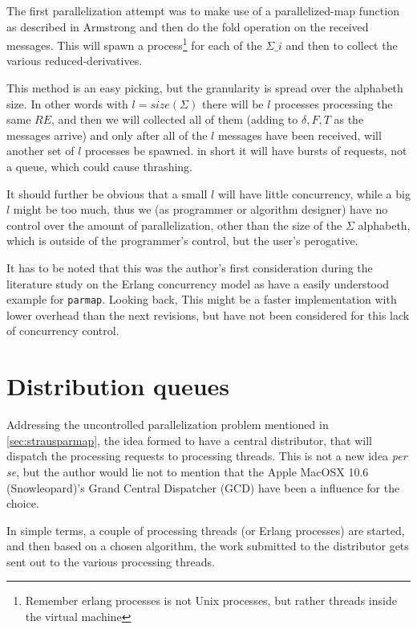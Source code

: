 \documentclass[a4paper,11pt]{report}
\begin{document}
The first parallelization attempt was to make use of a
parallelized-map function as described in Armstrong\cite{joe:09} and
then do the fold operation on the received messages. This will spawn a
process\footnote{Remember erlang processes is not Unix processes, but
	rather threads inside the virtual machine} for each of the
$\Sigma\_i$ and then to collect the various reduced-derivatives.

This method is an easy picking, but the granularity is spread
over the alphabeth size. In other words with $l=size(\Sigma)$ there
will be $l$ processes processing the same $RE$, and then we will
collected all of them (adding to $\delta,F,T$ as the messages arrive)
and only after all of the $l$ messages have been received, will
another set of $l$ processes be spawned. in short it will have bursts
of requests, not a queue, which could cause thrashing.

It should further be obvious that a small $l$ will have little
concurrency, while a big $l$ might be too much, thus we (as programmer
or algorithm designer) have
no control over the amount of parallelization, other than the size of
the $\Sigma$ alphabeth, which is outside of the programmer's
control, but the user's perogative.

It has to be noted that this was the author's first consideration
during the literature study on the Erlang concurrency model as
\cite{joe:09} have a easily understood example for \texttt{parmap}. Looking
back, This might be a faster implementation with lower overhead than
the next revisions, but have not been considered for this lack of
concurrency control.

\section{Distribution queues}

Addressing the uncontrolled parallelization problem mentioned in
\ref{sec:strausparmap}, the idea formed to have a central distributor,
that will dispatch the processing requests to processing threads. This
is not a new idea \emph{per se}, but the author would lie not to
mention that the Apple MacOSX 10.6 (Snowleopard)'s Grand Central
Dispatcher (GCD) have been a influence for the choice. 

In simple terms, a couple of processing threads (or Erlang processes)
are started, and then based on a chosen algorithm, the work submitted
to the distributor gets sent out to the various processing threads. 
\end{document}
